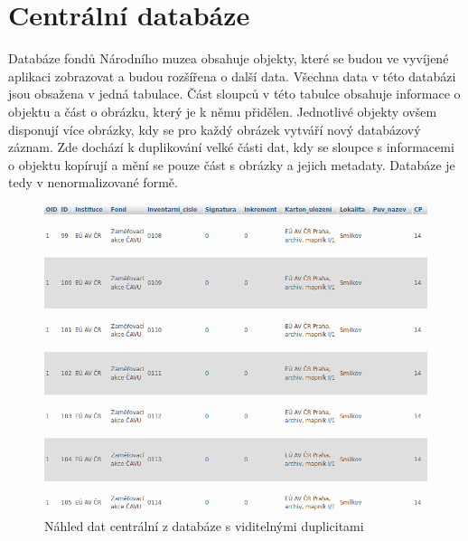 \section{Centrální databáze}
\label{centralni-db}
Databáze fondů Národního muzea obsahuje objekty, které se budou ve 
vyvíjené aplikaci zobrazovat a budou rozšířena o další data. Všechna data 
v této databázi jsou obsažena v jedná tabulace. Část sloupců v této tabulce 
obsahuje informace o objektu a část o obrázku, který je k němu přidělen. 
Jednotlivé objekty ovšem disponují více obrázky, kdy se pro každý obrázek
vytváří nový databázový záznam. Zde dochází k duplikování velké části dat, 
kdy se sloupce s informacemi o objektu kopírují a mění se pouze část s 
obrázky a jejich metadaty. Databáze je tedy v nenormalizované formě.

\begin{figure}[H] \centering
    \includegraphics[width=420pt]{./pictures/5-ukazka-basedata.PNG}
    \caption[Náhled dat z centrální databáze s viditelnými duplicitami]{Náhled dat centrální z databáze s viditelnými duplicitami}
	\label{fig:Náhled dat z centrální databáze s viditelnými duplicitami}              
\end{figure}


